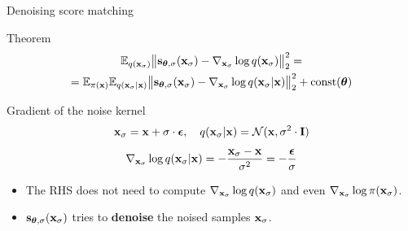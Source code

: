 \begin{frame}{Denoising score matching}
	\begin{block}{Theorem}
	\vspace{-0.5cm}
	\begin{multline*}
		\mathbb{E}_{q(\mathbf{x}_{\sigma})}\bigl\| \mathbf{s}_{\boldsymbol{\theta}, \sigma}(\mathbf{x}_{\sigma}) - \nabla_{\mathbf{x}_{\sigma}} \log q(\mathbf{x}_{\sigma}) \bigr\|^2_2 = \\
		= \mathbb{E}_{\pi(\mathbf{x})} \mathbb{E}_{q(\mathbf{x}_{\sigma} | \mathbf{x})}\bigl\| \mathbf{s}_{\boldsymbol{\theta}, \sigma}(\mathbf{x}_{\sigma}) - \nabla_{\mathbf{x}_{\sigma}} \log q(\mathbf{x}_{\sigma} | \mathbf{x}) \bigr\|^2_2 + \text{const}(\boldsymbol{\theta})
	\end{multline*}
	\vspace{-0.5cm}
	\end{block}
	\begin{block}{Gradient of the noise kernel}
		\vspace{-0.3cm}
		\[
			\mathbf{x}_{\sigma} = \mathbf{x} + \sigma \cdot \boldsymbol{\epsilon}, \quad q(\mathbf{x}_{\sigma} | \mathbf{x}) = \mathcal{N}(\mathbf{x}, \sigma^2 \cdot \mathbf{I})
		\]
		\vspace{-0.3cm}
		\[
			\nabla_{\mathbf{x}_{\sigma}} \log q(\mathbf{x}_{\sigma} | \mathbf{x}) = - \frac{\mathbf{x}_{\sigma} - \mathbf{x}}{\sigma^2}  = - \frac{\boldsymbol{\epsilon}}{\sigma}
		\]
		\vspace{-0.5cm}
	\end{block}
	\begin{itemize}
		\item The RHS does not need to compute $\nabla_{\mathbf{x}_{\sigma}} \log q(\mathbf{x}_{\sigma})$ and even $\nabla_{\mathbf{x}_{\sigma}} \log \pi(\mathbf{x}_{\sigma})$.
		\item $\mathbf{s}_{\boldsymbol{\theta}, \sigma}(\mathbf{x}_{\sigma})$ tries to \textbf{denoise} the noised samples $\mathbf{x}_{\sigma}$. 
	\end{itemize}
\end{frame}
